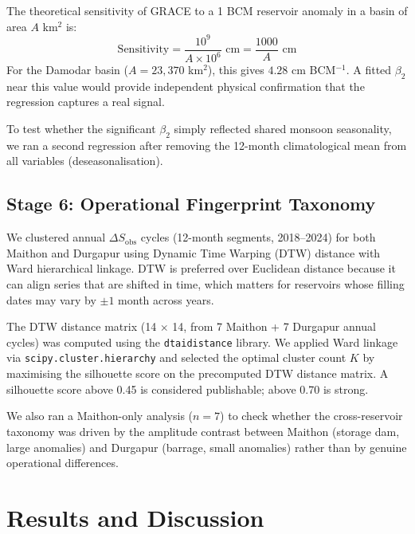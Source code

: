 \documentclass[12pt,a4paper,oneside]{report}
\newcommand{\dSobs}{\Delta S_{\mathrm{obs}}}
\begin{document}
The theoretical sensitivity of GRACE to a 1 BCM reservoir anomaly in a basin
of area $A$ km$^2$ is:
\begin{equation}
  \text{Sensitivity} = \frac{10^9}{A \times 10^6} \text{ cm} =
    \frac{1000}{A} \text{ cm}
  \label{eq:grace_sens}
\end{equation}
For the Damodar basin ($A = 23{,}370$ km$^2$), this gives
$4.28$ cm BCM$^{-1}$. A fitted $\beta_2$ near this value would provide
independent physical confirmation that the regression captures a real signal.

To test whether the significant $\beta_2$ simply reflected shared monsoon
seasonality, we ran a second regression after removing the 12-month
climatological mean from all variables (deseasonalisation).

\section{Stage 6: Operational Fingerprint Taxonomy}

We clustered annual $\dSobs$ cycles (12-month segments, 2018--2024) for both
Maithon and Durgapur using Dynamic Time Warping (DTW) distance
\citep{Sakoe1978} with Ward hierarchical linkage. DTW is preferred over
Euclidean distance because it can align series that are shifted in time,
which matters for reservoirs whose filling dates may vary by $\pm 1$ month
across years.

The DTW distance matrix (14 $\times$ 14, from 7 Maithon + 7 Durgapur annual
cycles) was computed using the \texttt{dtaidistance} library. We applied Ward
linkage via \texttt{scipy.cluster.hierarchy} and selected the optimal cluster
count $K$ by maximising the silhouette score on the precomputed DTW distance
matrix. A silhouette score above 0.45 is considered publishable; above 0.70
is strong.

We also ran a Maithon-only analysis ($n = 7$) to check whether the
cross-reservoir taxonomy was driven by the amplitude contrast between Maithon
(storage dam, large anomalies) and Durgapur (barrage, small anomalies)
rather than by genuine operational differences.


\chapter{Results and Discussion}
\label{ch:results}
\end{document}
